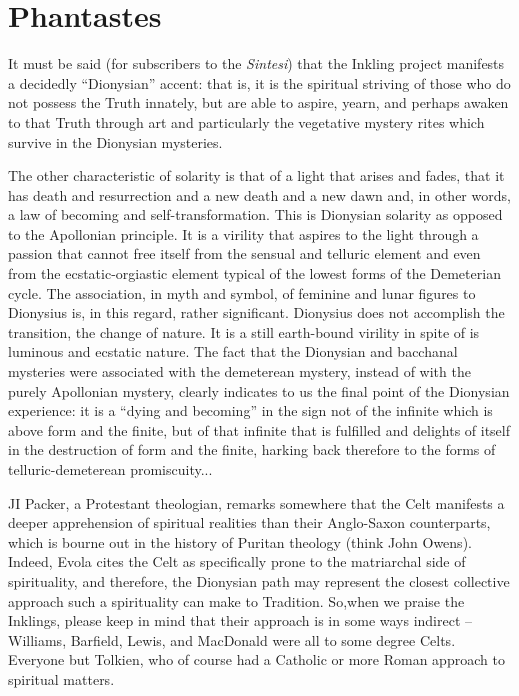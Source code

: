 \section{Phantastes}

It must be said (for subscribers to the \emph{Sintesi}) that the Inkling project manifests a decidedly ``Dionysian'' accent: that is, it is the spiritual striving of those who do not possess the Truth innately, but are able to aspire, yearn, and perhaps awaken to that Truth through art and particularly the vegetative mystery rites which survive in the Dionysian mysteries.

\begin{quotex}
The other characteristic of solarity is that of a light that arises and fades, that it has death and resurrection and a new death and a new dawn and, in other words, a law of becoming and self-transformation. This is Dionysian solarity as opposed to the Apollonian principle. It is a virility that aspires to the light through a passion that cannot free itself from the sensual and telluric element and even from the ecstatic-orgiastic element typical of the lowest forms of the Demeterian cycle. The association, in myth and symbol, of feminine and lunar figures to Dionysius is, in this regard, rather significant. Dionysius does not accomplish the transition, the change of nature. It is a still earth-bound virility in spite of is luminous and ecstatic nature. The fact that the Dionysian and bacchanal mysteries were associated with the demeterean mystery, instead of with the purely Apollonian mystery, clearly indicates to us the final point of the Dionysian experience: it is a ``dying and becoming'' in the sign not of the infinite which is above form and the finite, but of that infinite that is fulfilled and delights of itself in the destruction of form and the finite, harking back therefore to the forms of telluric-demeterean promiscuity... 
\end{quotex}


JI Packer, a Protestant theologian, remarks somewhere that the Celt manifests a deeper apprehension of spiritual realities than their Anglo-Saxon counterparts, which is bourne out in the history of Puritan theology (think John Owens). Indeed, Evola cites the Celt as specifically prone to the matriarchal side of spirituality, and therefore, the Dionysian path may represent the closest collective approach such a spirituality can make to Tradition. So,when we praise the Inklings, please keep in mind that their approach is in some ways indirect -- Williams, Barfield, Lewis, and MacDonald were all to some degree Celts. Everyone but Tolkien, who of course had a Catholic or more Roman approach to spiritual matters.


